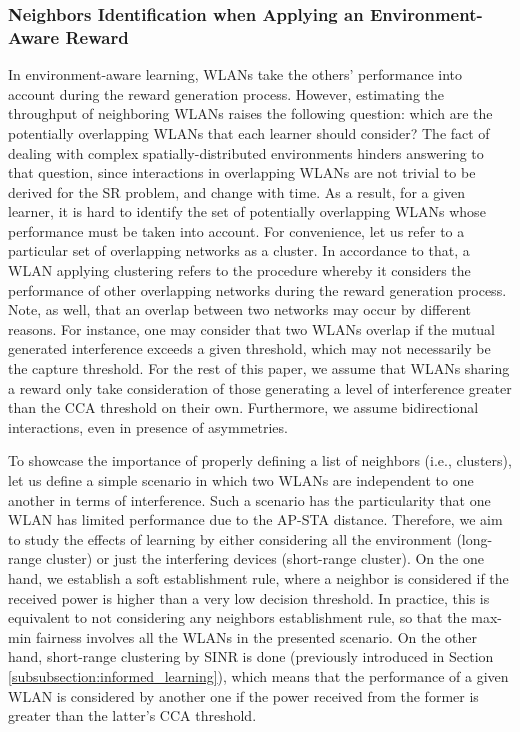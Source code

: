\documentclass{article}
\begin{document}
\subsubsection{Neighbors Identification when Applying an Environment-Aware Reward}
\label{subsubsection:clustering}
In environment-aware learning, WLANs take the others' performance into account during the reward generation process. However, estimating the throughput of neighboring WLANs raises the following question: which are the potentially overlapping WLANs that each learner should consider? The fact of dealing with complex spatially-distributed environments hinders answering to that question, since interactions in overlapping WLANs are not trivial to be derived for the SR problem, and change with time. As a result, for a given learner, it is hard to identify the set of potentially overlapping WLANs whose performance must be taken into account. For convenience, let us refer to a particular set of overlapping networks as a cluster. In accordance to that, a WLAN applying clustering refers to the procedure whereby it considers the performance of other overlapping networks during the reward generation process. Note, as well, that an overlap between two networks may occur by different reasons. For instance, one may consider that two WLANs overlap if the mutual generated interference exceeds a given threshold, which may not necessarily be the capture threshold. For the rest of this paper, we assume that WLANs sharing a reward only take consideration of those generating a level of interference greater than the CCA threshold on their own. Furthermore, we assume bidirectional interactions, even in presence of asymmetries.

To showcase the importance of properly defining a list of neighbors (i.e., clusters), let us define a simple scenario in which two WLANs are independent to one another in terms of interference. Such a scenario has the particularity that one WLAN has limited performance due to the AP-STA distance. Therefore, we aim to study the effects of learning by either considering all the environment (long-range cluster) or just the interfering devices (short-range cluster). On the one hand, we establish a soft establishment rule, where a neighbor is considered if the received power is higher than a very low decision threshold. In practice, this is equivalent to not considering any neighbors establishment rule, so that the max-min fairness involves all the WLANs in the presented scenario. On the other hand, short-range clustering by SINR is done (previously introduced in Section \ref{subsubsection:informed_learning}), which means that the performance of a given WLAN is considered by another one if the power received from the former is greater than the latter's CCA threshold.
\end{document}
